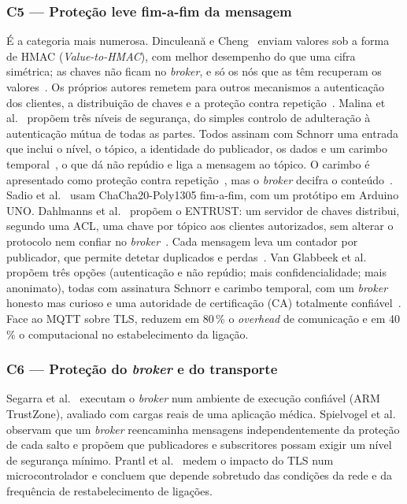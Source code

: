 \subsubsection{C5 --- Proteção leve fim-a-fim da mensagem}

É a categoria mais numerosa. Dinculeană e Cheng~\cite{dinculeana2019vulnerabilities}
enviam valores sob a forma de HMAC (\emph{Value-to-HMAC}), com melhor desempenho do
que uma cifra simétrica; as chaves não ficam no \emph{broker}, e só os nós que as
têm recuperam os valores~\cite[§5]{dinculeana2019vulnerabilities}. Os próprios autores remetem para outros mecanismos a
autenticação dos clientes, a distribuição de chaves e a proteção contra
repetição~\cite[§6]{dinculeana2019vulnerabilities}. Malina et
al.~\cite{malina2019secure} propõem três níveis de segurança, do simples controlo de
adulteração à autenticação mútua de todas as partes. Todos assinam com Schnorr uma
entrada que inclui o nível, o tópico, a identidade do publicador, os dados e um
carimbo temporal~\cite[§4.5, Eq.~6]{malina2019secure}, o que dá não repúdio e liga a
mensagem ao tópico. O carimbo é apresentado como proteção contra
repetição~\cite[§4.5]{malina2019secure}, mas o \emph{broker} decifra o
conteúdo~\cite[§4.6--4.7]{malina2019secure}. Sadio et al.~\cite{sadio2019lightweight} usam
ChaCha20-Poly1305 fim-a-fim, com um protótipo em Arduino UNO. Dahlmanns et
al.~\cite{dahlmanns2021entrust} propõem o ENTRUST: um servidor de chaves distribui,
segundo uma ACL, uma chave por tópico aos clientes autorizados, sem alterar o
protocolo nem confiar no \emph{broker}~\cite[§5.2--5.3]{dahlmanns2021entrust}. Cada
mensagem leva um contador por publicador, que permite detetar duplicados e
perdas~\cite[§5.3]{dahlmanns2021entrust}. Van Glabbeek et
al.~\cite{vanglabbeek2022flexible} propõem três opções (autenticação e não repúdio;
mais confidencialidade; mais anonimato), todas com assinatura Schnorr e carimbo
temporal, com um \emph{broker} honesto mas curioso e uma autoridade de
certificação (CA) totalmente confiável~\cite[§3.1, §4.3]{vanglabbeek2022flexible}. Face ao MQTT sobre TLS, reduzem
em 80\,\% o \emph{overhead} de comunicação e em 40\,\% o computacional no
estabelecimento da ligação.

\subsubsection{C6 --- Proteção do \emph{broker} e do transporte}

Segarra et al.~\cite{segarra2020mqttz} executam o \emph{broker} num ambiente de
execução confiável (ARM TrustZone), avaliado com cargas reais de uma aplicação
médica. Spielvogel et al.~\cite{spielvogel2021tls} observam que um \emph{broker}
reencaminha mensagens independentemente da proteção de cada salto e propõem que
publicadores e subscritores possam exigir um nível de segurança mínimo. Prantl et
al.~\cite{prantl2021performance} medem o impacto do TLS num microcontrolador e
concluem que depende sobretudo das condições da rede e da frequência de
restabelecimento de ligações.

